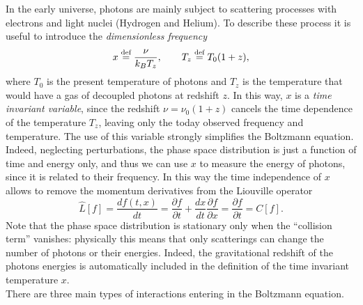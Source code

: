 In the early universe, photons are mainly subject to scattering processes with electrons and light nuclei (Hydrogen and Helium). To describe these process it is useful to introduce the \emph{dimensionless frequency}
\begin{equation}\label{eq:dimensionless_frequency}
    x\stackrel{\text{def}}{=}\frac{\nu}{k_BT_z},\qquad T_z\stackrel{\text{def}}{=} T_0(1+z),
\end{equation}
where $T_0$ is the present temperature of photons and $T_z$ is the temperature that would have a gas of decoupled photons at redshift $z$. In this way, $x$ is a \emph{time invariant variable}, since the redshift $\nu=\nu_0(1+z)$ cancels the time dependence of the temperature $T_z$, leaving only the today observed frequency and temperature. The use of this variable strongly simplifies the Boltzmann equation. Indeed, neglecting perturbations, the phase space distribution is just a function of time and energy only, and thus we can use $x$ to measure the energy of photons, since it is related to their frequency. In this way the time independence of $x$ allows to remove the momentum derivatives from the Liouville operator $$ \hat{L}[f]=\frac{df(t,x)}{dt}=\frac{\partial f}{\partial t}+\frac{dx}{dt}\frac{\partial f}{\partial x}=\frac{\partial f}{\partial t}=C[f].$$
Note that the phase space distribution is stationary only when the ``collision term'' vanishes: physically this means that only scatterings can change the number of photons or their energies. Indeed, the gravitational redshift of the photons energies is automatically included in the definition of the time invariant temperature $x$.\\
There are three main types of interactions entering in the Boltzmann equation.
